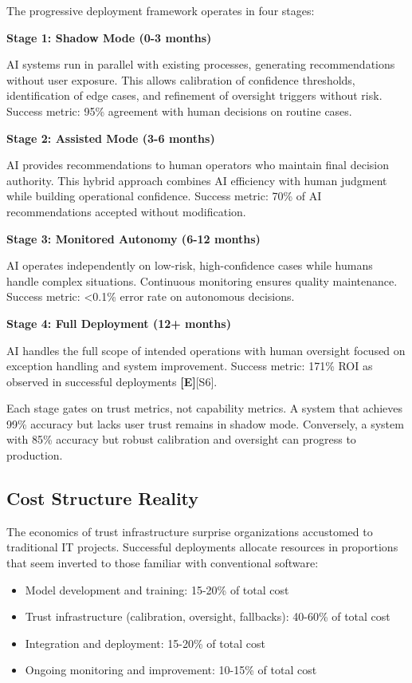 \documentclass[a4paper,11pt]{article}
\newcommand{\elabel}{\textbf{\textcolor{ecolor}{[E]}}}
\begin{document}
The progressive deployment framework operates in four stages:


\textbf{Stage 1: Shadow Mode (0-3 months)}\par
AI systems run in parallel with existing processes, generating recommendations without user exposure. This allows calibration of confidence thresholds, identification of edge cases, and refinement of oversight triggers without risk. Success metric: 95\% agreement with human decisions on routine cases.


\textbf{Stage 2: Assisted Mode (3-6 months)}\par
AI provides recommendations to human operators who maintain final decision authority. This hybrid approach combines AI efficiency with human judgment while building operational confidence. Success metric: 70\% of AI recommendations accepted without modification.


\textbf{Stage 3: Monitored Autonomy (6-12 months)}\par
AI operates independently on low-risk, high-confidence cases while humans handle complex situations. Continuous monitoring ensures quality maintenance. Success metric: <0.1\% error rate on autonomous decisions.


\textbf{Stage 4: Full Deployment (12+ months)}\par
AI handles the full scope of intended operations with human oversight focused on exception handling and system improvement. Success metric: 171\% ROI as observed in successful deployments \elabel{}\textcolor{primary}{[S6]}.


Each stage gates on trust metrics, not capability metrics. A system that achieves 99\% accuracy but lacks user trust remains in shadow mode. Conversely, a system with 85\% accuracy but robust calibration and oversight can progress to production.


\subsection{Cost Structure Reality}

The economics of trust infrastructure surprise organizations accustomed to traditional IT projects. Successful deployments allocate resources in proportions that seem inverted to those familiar with conventional software:


\begin{itemize}
  \item Model development and training: 15-20\% of total cost
  \item Trust infrastructure (calibration, oversight, fallbacks): 40-60\% of total cost
  \item Integration and deployment: 15-20\% of total cost
  \item Ongoing monitoring and improvement: 10-15\% of total cost
\end{itemize}
\end{document}
